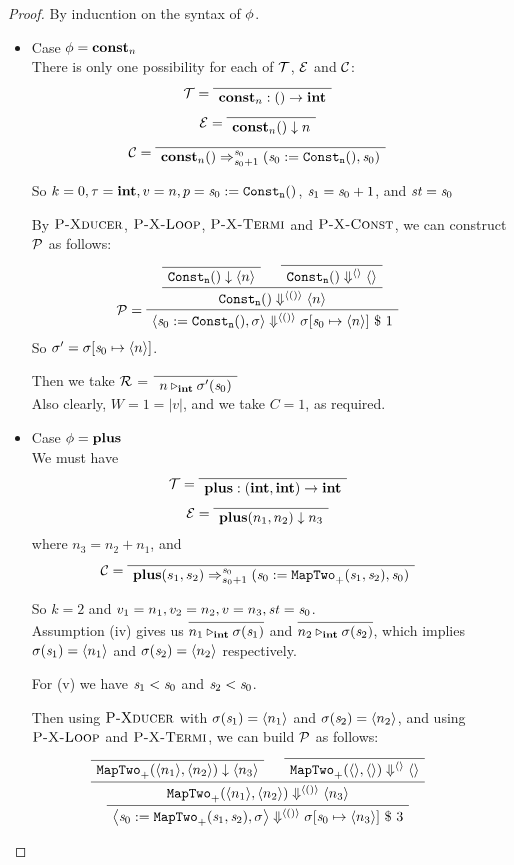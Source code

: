 \begin{proof}
By inducntion on the syntax of $\phi$.
\begin{itemize}
	\item \label{thm-case-const} Case $\phi = \mathbf{const}_{n}$ \\ 	
	There is only one possibility for each of $\mathcal{T}$, $\mathcal{E}$ and $\mathcal{C}$:
	$$\MT = \PT{ \Axiom{\Typef{\constn{n}}{}{\int}}}$$
	$$\ME = \PT{\Axiom{\EvalF{\constn{n}}{}{n}}}$$
	$$\MC = \PT{\Axiom{\Transf{\constn{n}}{}{\s_0}{\s_0+1}
			{\sfun{\sdef{\s_0}{\constaf{n}}}{\s_0}}}}$$

\def\pconst{\sdef{\s_0}{\constaf{n}}}
	So $k=0,\tau = \int, v = n, p = \pconst$, $\mathit{s}_1 = \mathit{s}_0+1$, and $\mathit{st} = \mathit{s}_0$

	By $\textsc{P-Xducer}$, $\textsc{P-X-Loop}$, $\textsc{P-X-Termi}$ and $\textsc{P-X-Const}$, we can construct $\mathcal{P}$ as follows:
	$$\PT{
		\Axiom{\blockf{\consta{n}}{}{\singl{n}}}
		\Axiom{\sevalfg{\consta{n}}{}{\emptyv}{\emptyv}}
		\BC{\sevalfg{\consta{n}}{}{\vunit}{\singl{n}}}
		\LeLa{\MP = }
		\UC{\seval{\pconst}{\sgm}{\vunit}{\sgm[\s_0 \|-> \singl{n}]}{1}}			
	}$$
	So $\sgm' = \sgm[\s_0 \|-> \singl{n}]$.
	
	Then we take $\mathcal{R}$ = $\PT{\Axiom{\ValRep{n}{\int}{\sgm'(\s_0)}}}$ \\
	Also clearly, $ W = 1 = |v|$, and we take $C=1$, as required.
	
		
	\item \label{thm-case-plus} Case $\phi = \mathbf{plus}$ \\ 	
	We must have 
	$$\MT = \PT{\Axiom{\Typef{\plusn}{\int,\int}{\int}}}$$
	$$\ME = \PT{\Axiom{\EvalF{\plusn}{n_1,n_2}{n_3}}}$$ where $n_3 = n_2 + n_1$, and 
	$$\MC = \PT{\Axiom{\Transf{\plusn}{s_1,s_2}{\s_0}{s_0+1}
			{\sfun{\sdef{\s_0}{\maptwof{+}{\s_1}{\s_2}}}}{\s_0}}}$$

\def\pplus{\sdef{\s_0}{\maptwof{+}{\s_1}{\s_2}}}	
	So $k=2$ and $v_1= n_1, v_2= n_2, v = n_3, \mathit{st} = \mathit{s}_0$. \\
	 
	 Assumption (iv) gives us
	 $\infer{\ValRep{n_1}{\int}{\sgm(\s_1)}}{}$ and 
	 $\infer{\ValRep{n_2}{\int}{\sgm(\s_2)}}{}$, which implies
	 $\sigma(\mathit{s}_1) = \langle n_1 \rangle$ and $\sigma(\mathit{s}_2) = \langle n_2 \rangle$ respectively. 
	 
	 For (v) we have $\mathit{s}_1 < \mathit{s}_0$ and $\mathit{s}_2 < \mathit{s}_0$. 
	 
	 Then using $\textsc{P-Xducer}$ with $\sigma(\mathit{s}_1)= \langle n_1 \rangle$ and $ \sigma(\mathit{s}_2) = \langle n_2 \rangle$, 
	 and using $\textsc{P-X-Loop}$ and $\textsc{P-X-Termi}$, 
	 we can build $\mathcal{P}$ as follows: 
	 $$\PT{
		\Axiom{\blockf{\maptwo{+}}{\singl{n_1}, \singl{n_2}}{\singl{n_3}}}
		\Axiom{\sevalfg{\maptwo{+}}{\emptyv,\emptyv}{\emptyv}{\emptyv}}
		\BC{\sevalfg{\maptwo{+}}{\singl{n_1},\singl{n_2}}{\vunit}{\singl{n_3}}}
		\UC{\seval{\pplus}{\sgm}{\vunit}{\sgm[\s_0 \|-> \singl{n_3}]}{3}}
	 }$$  
		

\end{itemize}
\end{proof}
